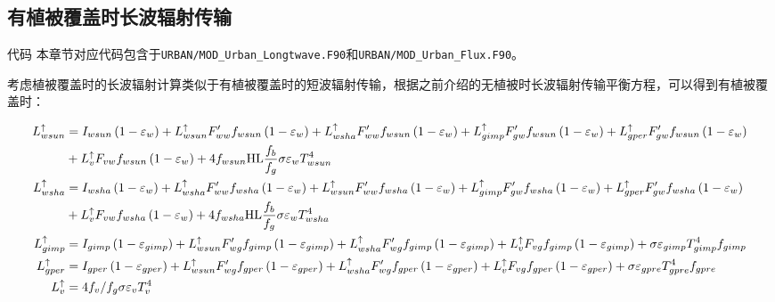\subsection{有植被覆盖时长波辐射传输}\label{有植被覆盖时长波辐射传输}
\begin{mymdframed}{代码}
本章节对应代码包含于\texttt{URBAN/MOD\_Urban\_Longtwave.F90}和\texttt{URBAN/MOD\_Urban\_\allowbreak Flux.F90}。
\end{mymdframed}

考虑植被覆盖时的长波辐射计算类似于有植被覆盖时的短波辐射传输，根据之前介绍的无植被时长波辐射传输平衡方程，可以得到有植被覆盖时： 
\begin{landscape}
\begin{equation}
    \begin{aligned}
    L_{{wsun }}^{\uparrow} &=I_{{wsun }}\left(1-\varepsilon_{w}\right)+L_{wsun}^{\uparrow} F_{ww}^{\prime} f_{wsun}\left(1-\varepsilon_{w}\right)+L_{wsha}^{\uparrow} F_{ww}^{\prime} f_{wsun}\left(1-\varepsilon_{w}\right)+L_{gimp}^{\uparrow} F_{g w}^{\prime} f_{wsun}\left(1-\varepsilon_{w}\right)+L_{gper}^{\uparrow} F_{g w}^{\prime} f_{wsun}\left(1-\varepsilon_{w}\right)\\ &+L_{v}^{\uparrow} F_{vw} f_{wsun}\left(1-\varepsilon_{w}\right)+4 f_{wsun} {\rm HL} \frac{f_{b}}{f_{g}} \sigma \varepsilon_{w} T_{wsun}^{4} \\
    L_{wsha}^{\uparrow} &=I_{wsha}\left(1-\varepsilon_{w}\right)+L_{wsha}^{\uparrow} F_{ww}^{\prime} f_{wsha}\left(1-\varepsilon_{w}\right)+L_{wsun}^{\uparrow} F_{ww}^{\prime} f_{wsha}\left(1-\varepsilon_{w}\right)+L_{gimp}^{\uparrow} F_{g w}^{\prime} f_{wsha}\left(1-\varepsilon_{w}\right)+L_{gper}^{\uparrow} F_{g w}^{\prime} f_{wsha}\left(1-\varepsilon_{w}\right)\\ &+L_{v}^{\uparrow} F_{v w} f_{wsha}\left(1-\varepsilon_{w}\right)+4 f_{wsha} { \rm HL} \frac{f_{b}}{f_{g}} \sigma \varepsilon_{w} T_{wsha}^{4}\\
    L_{gimp}^{\uparrow} &=I_{gimp}\left(1-\varepsilon_{gimp}\right)+L_{wsun}^{\uparrow} F_{w g}^{\prime} f_{gimp}\left(1-\varepsilon_{gimp}\right)+L_{wsha}^{\uparrow} F_{w g}^{\prime} f_{gimp}\left(1-\varepsilon_{gimp}\right)+L_{v}^{\uparrow} F_{v g} f_{gimp}\left(1-\varepsilon_{gimp}\right)+\sigma \varepsilon_{gimp} T_{gimp}^{4} f_{gimp} \\
    L_{gper}^{\uparrow} &=I_{gper}\left(1-\varepsilon_{gper}\right)+L_{wsun}^{\uparrow} F_{w g}^{\prime} f_{gper}\left(1-\varepsilon_{gper}\right)+L_{wsha}^{\uparrow} F_{w g}^{\prime} f_{gper}\left(1-\varepsilon_{gper}\right)+L_{v}^{\uparrow} F_{v g} f_{gper}\left(1-\varepsilon_{gper}\right)+\sigma \varepsilon_{{gpre }} T_{{gpre }}^{4} f_{{gpre }} \\
    L_{v}^{\uparrow} &=4 f_{v} / f_{g} \sigma \varepsilon_{v} T_{v}^{4}
    \end{aligned}
\end{equation}
\end{landscape}

